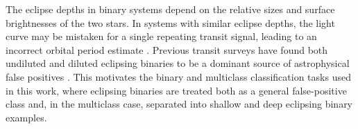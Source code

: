 The eclipse depths in binary systems depend on the relative sizes and surface brightnesses of the two stars. In systems with similar eclipse depths, the light curve may be mistaken for a single repeating transit signal, leading to an incorrect orbital period estimate \citep{fp_first_habitable_zone}. Previous transit surveys have found both undiluted and diluted eclipsing binaries to be a dominant source of astrophysical false positives \citep{2008A&A...488L..47M, 2009IAUS..253..382A, 2013A&A...553A..30T}. This motivates the binary and multiclass classification tasks used in this work, where eclipsing binaries are treated both as a general false-positive class and, in the multiclass case, separated into shallow and deep eclipsing binary examples.